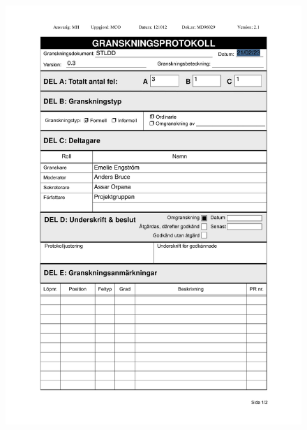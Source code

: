 \documentclass{article}
\begin{document}
 
 \begin{figure}
     \centering
     \includegraphics[width=13cm]{images/STLDD - Granskningsprotokoll-1}
     \renewcommand\figurename{Figure}
     \label{fig:my_label}
 \end{figure}
 
\end{document}
